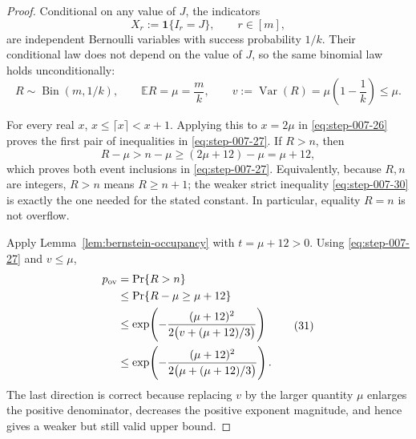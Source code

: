 \begin{proof}

Conditional on any value of \(J\), the indicators
\[
X_r:=\mathbf1\{I_r=J\},\qquad r\in[m],
\tag{28}\label{eq:step-007-28}
\]
are independent Bernoulli variables with success probability \(1/k\).
Their conditional law does not depend on the value of \(J\), so the
same binomial law holds unconditionally:
\[
R\sim\operatorname{Bin}(m,1/k),
\qquad
\mathbb ER=\mu=\frac mk,
\qquad
v:=\operatorname{Var}(R)
=\mu\left(1-\frac1k\right)\le\mu.
\tag{29}\label{eq:step-007-29}
\]

For every real \(x\), \(x\le\lceil x\rceil<x+1\).  Applying this to
\(x=2\mu\) in \eqref{eq:step-007-26} proves the first pair of inequalities in \eqref{eq:step-007-27}.
If \(R>n\), then
\[
R-\mu>n-\mu\ge(2\mu+12)-\mu=\mu+12,
\tag{30}\label{eq:step-007-30}
\]
which proves both event inclusions in \eqref{eq:step-007-27}.  Equivalently, because
\(R,n\) are integers, \(R>n\) means \(R\ge n+1\); the weaker strict
inequality \eqref{eq:step-007-30} is exactly the one needed for the stated constant.
In particular, equality \(R=n\) is not overflow.

Apply Lemma~\ref{lem:bernstein-occupancy} with
\(t=\mu+12>0\).  Using \eqref{eq:step-007-27} and \(v\le\mu\),
\[
\begin{aligned}
p_{\rm ov}
&=\Pr\{R>n\}\\
&\le\Pr\{R-\mu\ge\mu+12\}\\
&\le
\exp\!\left(
-\frac{(\mu+12)^2}
{2\bigl(v+(\mu+12)/3\bigr)}
\right)\\
&\le
\exp\!\left(
-\frac{(\mu+12)^2}
{2\bigl(\mu+(\mu+12)/3\bigr)}
\right).
\end{aligned}
\tag{31}\label{eq:step-007-31}
\]
The last direction is correct because replacing \(v\) by the larger
quantity \(\mu\) enlarges the positive denominator, decreases the
positive exponent magnitude, and hence gives a weaker but still valid
upper bound.


\end{proof}
